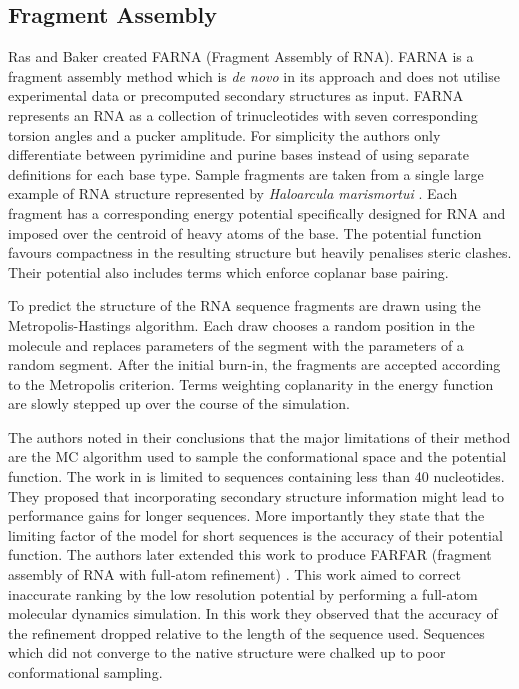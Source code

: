 \documentclass[journal]{IEEEtran}
\begin{document}
\subsection{Fragment Assembly}
\label{subsec:fragment-assembly}

Ras and Baker \cite{das2007automated} created FARNA (Fragment Assembly of RNA). FARNA is a fragment assembly method which is \textit{de novo} in its approach and does not utilise experimental data or precomputed secondary structures as input. FARNA represents an RNA as a collection of trinucleotides with seven corresponding torsion angles and a pucker amplitude. For simplicity the authors only differentiate between pyrimidine and purine bases instead of using separate definitions for each base type. Sample fragments are taken from a single large example of RNA structure represented by \textit{Haloarcula marismortui} \cite{ban2000complete}. Each fragment has a corresponding energy potential specifically designed for RNA and imposed over the centroid of heavy atoms of the base. The potential function favours compactness in the resulting structure but heavily penalises steric clashes. Their potential also includes terms which enforce coplanar base pairing. 

To predict the structure of the RNA sequence fragments are drawn using the Metropolis-Hastings algorithm. Each draw chooses a random position in the molecule and replaces parameters of the segment with the parameters of a random segment. After the initial burn-in, the fragments are accepted according to the Metropolis criterion. Terms weighting coplanarity in the energy function are slowly stepped up over the course of the simulation.

The authors noted in their conclusions that the major limitations of their method are the MC algorithm used to sample the conformational space and the potential function. The work in \cite{das2007automated} is limited to sequences containing less than 40 nucleotides. They proposed that incorporating secondary structure information might lead to performance gains for longer sequences. More importantly they state that the limiting factor of the model for short sequences is the accuracy of their potential function. The authors later extended this work to produce FARFAR (fragment assembly of RNA with full-atom refinement) \cite{das2010atomic}. This work aimed to correct inaccurate ranking by the low resolution potential by performing a full-atom molecular dynamics simulation. In this work they observed that the accuracy of the refinement dropped relative to the length of the sequence used. Sequences which did not converge to the native structure were chalked up to poor conformational sampling.
\end{document}
